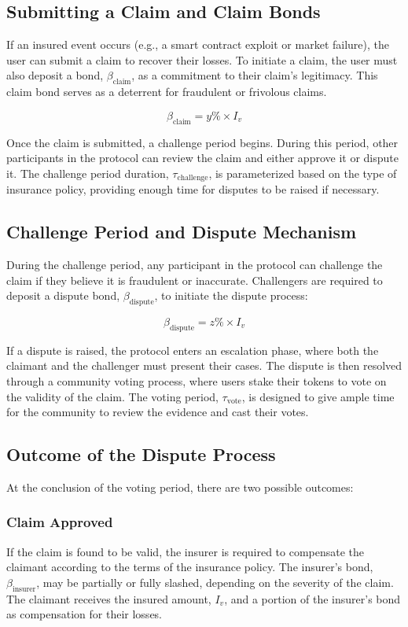 \documentclass{article}
\begin{document}
\subsection{Submitting a Claim and Claim Bonds}

If an insured event occurs (e.g., a smart contract exploit or market failure), the user can submit a claim to recover their losses. To initiate a claim, the user must also deposit a bond, $\beta_{\text{claim}}$, as a commitment to their claim's legitimacy. This claim bond serves as a deterrent for fraudulent or frivolous claims.

\[
\beta_{\text{claim}} = y\% \times I_v
\]

Once the claim is submitted, a challenge period begins. During this period, other participants in the protocol can review the claim and either approve it or dispute it. The challenge period duration, $\tau_{\text{challenge}}$, is parameterized based on the type of insurance policy, providing enough time for disputes to be raised if necessary.

\subsection{Challenge Period and Dispute Mechanism}

During the challenge period, any participant in the protocol can challenge the claim if they believe it is fraudulent or inaccurate. Challengers are required to deposit a dispute bond, $\beta_{\text{dispute}}$, to initiate the dispute process:

\[
\beta_{\text{dispute}} = z\% \times I_v
\]

If a dispute is raised, the protocol enters an escalation phase, where both the claimant and the challenger must present their cases. The dispute is then resolved through a community voting process, where users stake their tokens to vote on the validity of the claim. The voting period, $\tau_{\text{vote}}$, is designed to give ample time for the community to review the evidence and cast their votes.

\subsection{Outcome of the Dispute Process}

At the conclusion of the voting period, there are two possible outcomes:

\subsubsection{Claim Approved}
If the claim is found to be valid, the insurer is required to compensate the claimant according to the terms of the insurance policy. The insurer’s bond, $\beta_{\text{insurer}}$, may be partially or fully slashed, depending on the severity of the claim. The claimant receives the insured amount, $I_v$, and a portion of the insurer’s bond as compensation for their losses.
\end{document}
